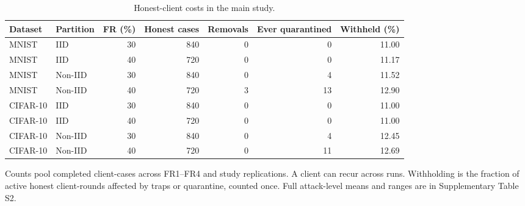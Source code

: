 \begin{table}[t]\centering\footnotesize
\caption{Honest-client costs in the main study.}\label{tab:safety}
\begin{tabular}{llrrrrr}\toprule
Dataset & Partition & FR (\%) & Honest cases & Removals & Ever quarantined & Withheld (\%) \\ \midrule
MNIST & IID & 30 & 840 & 0 & 0 & 11.00 \\
MNIST & IID & 40 & 720 & 0 & 0 & 11.17 \\
MNIST & Non-IID & 30 & 840 & 0 & 4 & 11.52 \\
MNIST & Non-IID & 40 & 720 & 3 & 13 & 12.90 \\
\midrule
CIFAR-10 & IID & 30 & 840 & 0 & 0 & 11.00 \\
CIFAR-10 & IID & 40 & 720 & 0 & 0 & 11.00 \\
CIFAR-10 & Non-IID & 30 & 840 & 0 & 4 & 12.45 \\
CIFAR-10 & Non-IID & 40 & 720 & 0 & 11 & 12.69 \\
\bottomrule\end{tabular}
\par\smallskip\parbox{.96\textwidth}{\scriptsize Counts pool completed client-cases across FR1--FR4 and study replications. A client can recur across runs. Withholding is the fraction of active honest client-rounds affected by traps or quarantine, counted once. Full attack-level means and ranges are in Supplementary Table S2.}
\end{table}
